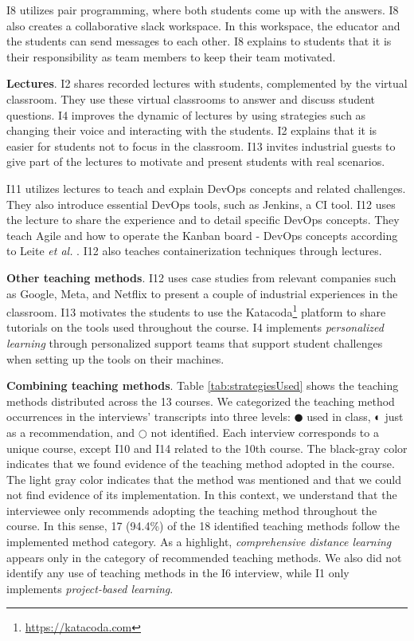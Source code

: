 \documentclass[10pt,conference]{IEEEtran}
\begin{document}
I8 utilizes pair programming, where both students come up with the answers. I8 also creates a collaborative slack workspace. In this workspace, the educator and the students can send messages to each other. I8 explains to students that it is their responsibility as team members to keep their team motivated.

\textbf{Lectures}. I2 shares recorded lectures with students, complemented by the virtual classroom. They use these virtual classrooms to answer and discuss student questions. I4 improves the dynamic of lectures by using strategies such as changing their voice and interacting with the students. I2 explains that it is easier for students not to focus in the classroom. I13 invites industrial guests to give part of the lectures to motivate and present students with real scenarios.

I11 utilizes lectures to teach and explain DevOps concepts and related challenges. They also introduce essential DevOps tools, such as Jenkins, a CI tool. I12 uses the lecture to share the experience and to detail specific DevOps concepts. They teach Agile and how to operate the Kanban board - DevOps concepts according to Leite \textit{et al.} \cite{leite:2019}. I12 also teaches containerization techniques through lectures.

\textbf{Other teaching methods}. I12 uses case studies from relevant companies such as Google, Meta, and Netflix to present a couple of industrial experiences in the classroom. I13 motivates the students to use the Katacoda\footnote{\url{https://katacoda.com}} platform to share tutorials on the tools used throughout the course. I4 implements \textsl{personalized learning} through personalized support teams that support student challenges when setting up the tools on their machines.

\textbf{Combining teaching methods}. Table \ref{tab:strategiesUsed} shows the teaching methods distributed across the 13 courses. 
We categorized the teaching method occurrences in the interviews' transcripts into three levels: 
$\CIRCLE$ used in class, $\LEFTcircle$ just as a recommendation, and $\Circle$ not identified. Each interview corresponds to a unique course, except I10 and I14 related to the 10th course. The black-gray color indicates that we found evidence of the teaching method adopted in the course. The light gray color indicates that the method was mentioned and that we could not find evidence of its implementation. In this context, we understand that the interviewee only recommends adopting the teaching method throughout the course. In this sense, 17 (94.4\%) of the 18 identified teaching methods follow the implemented method category. As a highlight, \textsl{comprehensive distance learning} appears only in the category of recommended teaching methods. We also did not identify any use of teaching methods in the I6 interview, while I1 only implements \textsl{project-based learning}.
\end{document}
